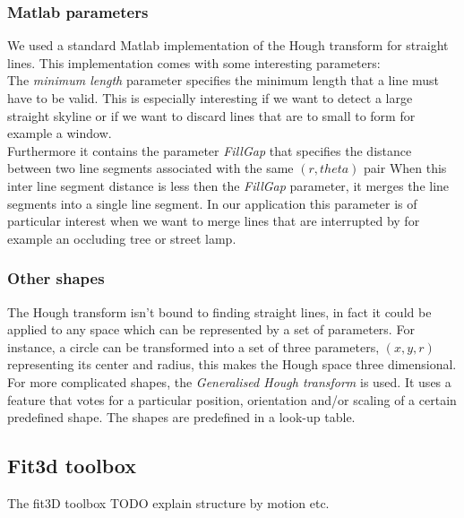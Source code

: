 \subsubsection{Matlab parameters}
We used a standard Matlab implementation of the Hough transform for straight lines.  This implementation comes with some interesting parameters:\\

	The \emph{minimum length} parameter specifies the minimum length that a line must have to be valid. This is especially interesting if we want to detect a large straight skyline or if we want to discard lines that are to small to form for example a window.\\

	Furthermore it contains the parameter \emph{FillGap} that specifies the distance
	between two line segments associated with the same $(r, theta)$ pair
	When this inter line segment distance is less then the \emph{FillGap} parameter, it merges the line segments into a single line segment. In our application this parameter is of particular interest when we want to merge lines that are interrupted by for example an occluding tree or street lamp.\\


\subsubsection{Other shapes}
The Hough transform isn't bound to finding straight lines, in fact it could be
applied to any space which can be represented by a set of parameters.  For
instance, a circle can be transformed into a set of three parameters, $(x,y,r)$
representing its center and radius, this makes the Hough space three
dimensional. 
For more complicated shapes, the 
\emph{Generalised Hough transform} is used.
It uses a feature that votes for a particular position, orientation and/or scaling of a certain predefined shape.  The shapes are predefined in a look-up table.





\subsection{Fit3d toolbox}
The fit3D toolbox \cite{Fit3d} 
TODO explain structure by motion etc.

